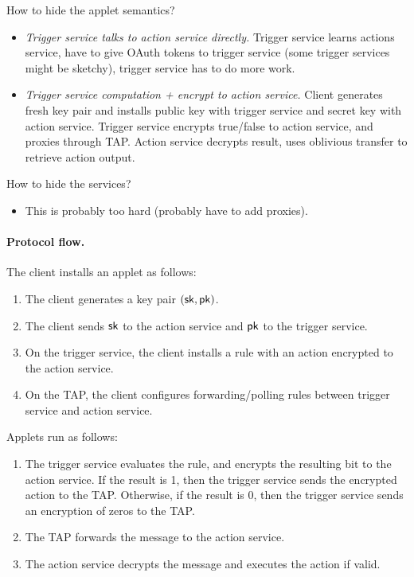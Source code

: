 How to hide the applet semantics?
\begin{itemize}[leftmargin=*]
  \item \emph{Trigger service talks to action service directly.} Trigger service
    learns actions service, have to give OAuth tokens to trigger service (some
    trigger services might be sketchy), trigger service has to do more work.
  \item \emph{Trigger service computation + encrypt to action service.}  Client
    generates fresh key pair and installs public key with trigger service and
    secret key with action service. Trigger service encrypts true/false to
    action service, and proxies through TAP. Action service decrypts result,
    uses oblivious transfer to retrieve action output.
\end{itemize}\bigskip

How to hide the services?
\begin{itemize}[leftmargin=*]
  \item This is probably too hard (probably have to add proxies).
\end{itemize}\bigskip

\paragraph{Protocol flow.}
The client installs an applet as follows:
\begin{enumerate}[leftmargin=*]
\item The client generates a key pair $(\mathsf{sk}, \mathsf{pk})$.
\item The client sends $\mathsf{sk}$ to the action service and $\mathsf{pk}$ to the trigger
  service.
\item On the trigger service, the client installs a rule with an action
  encrypted to the action service.
\item On the TAP, the client configures forwarding/polling rules between trigger
  service and action service.
\end{enumerate}
Applets run as follows:
\begin{enumerate}[leftmargin=*]
\item The trigger service evaluates the rule, and encrypts the resulting bit to
  the action service. If the result is 1, then the trigger service sends the
  encrypted action to the TAP. Otherwise, if the result is 0, then the trigger
  service sends an encryption of zeros to the TAP.
\item The TAP forwards the message to the action service.
\item The action service decrypts the message and executes the action if valid.
\end{enumerate}

